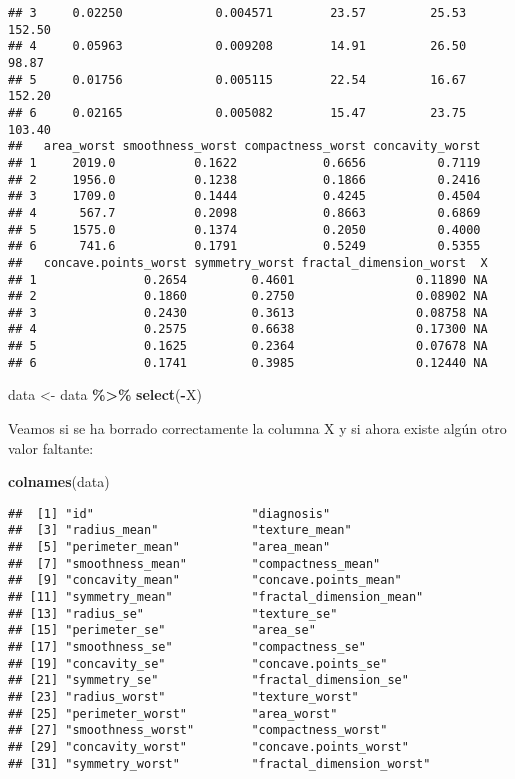 \documentclass[
]{article}
\newenvironment{Shaded}{\begin{snugshade}}{\end{snugshade}}
\newcommand{\FunctionTok}[1]{\textcolor[rgb]{0.13,0.29,0.53}{\textbf{#1}}}
\newcommand{\NormalTok}[1]{#1}
\newcommand{\OtherTok}[1]{\textcolor[rgb]{0.56,0.35,0.01}{#1}}
\newcommand{\SpecialCharTok}[1]{\textcolor[rgb]{0.81,0.36,0.00}{\textbf{#1}}}
\begin{document}
\begin{verbatim}
## 3     0.02250             0.004571        23.57         25.53          152.50
## 4     0.05963             0.009208        14.91         26.50           98.87
## 5     0.01756             0.005115        22.54         16.67          152.20
## 6     0.02165             0.005082        15.47         23.75          103.40
##   area_worst smoothness_worst compactness_worst concavity_worst
## 1     2019.0           0.1622            0.6656          0.7119
## 2     1956.0           0.1238            0.1866          0.2416
## 3     1709.0           0.1444            0.4245          0.4504
## 4      567.7           0.2098            0.8663          0.6869
## 5     1575.0           0.1374            0.2050          0.4000
## 6      741.6           0.1791            0.5249          0.5355
##   concave.points_worst symmetry_worst fractal_dimension_worst  X
## 1               0.2654         0.4601                 0.11890 NA
## 2               0.1860         0.2750                 0.08902 NA
## 3               0.2430         0.3613                 0.08758 NA
## 4               0.2575         0.6638                 0.17300 NA
## 5               0.1625         0.2364                 0.07678 NA
## 6               0.1741         0.3985                 0.12440 NA
\end{verbatim}

\begin{Shaded}
\begin{Highlighting}[]
\NormalTok{data }\OtherTok{\textless{}{-}}\NormalTok{ data }\SpecialCharTok{\%\textgreater{}\%} \FunctionTok{select}\NormalTok{(}\SpecialCharTok{{-}}\NormalTok{X)}
\end{Highlighting}
\end{Shaded}

Veamos si se ha borrado correctamente la columna X y si ahora existe
algún otro valor faltante:

\begin{Shaded}
\begin{Highlighting}[]
\FunctionTok{colnames}\NormalTok{(data)}
\end{Highlighting}
\end{Shaded}

\begin{verbatim}
##  [1] "id"                      "diagnosis"              
##  [3] "radius_mean"             "texture_mean"           
##  [5] "perimeter_mean"          "area_mean"              
##  [7] "smoothness_mean"         "compactness_mean"       
##  [9] "concavity_mean"          "concave.points_mean"    
## [11] "symmetry_mean"           "fractal_dimension_mean" 
## [13] "radius_se"               "texture_se"             
## [15] "perimeter_se"            "area_se"                
## [17] "smoothness_se"           "compactness_se"         
## [19] "concavity_se"            "concave.points_se"      
## [21] "symmetry_se"             "fractal_dimension_se"   
## [23] "radius_worst"            "texture_worst"          
## [25] "perimeter_worst"         "area_worst"             
## [27] "smoothness_worst"        "compactness_worst"      
## [29] "concavity_worst"         "concave.points_worst"   
## [31] "symmetry_worst"          "fractal_dimension_worst"
\end{verbatim}
\end{document}
